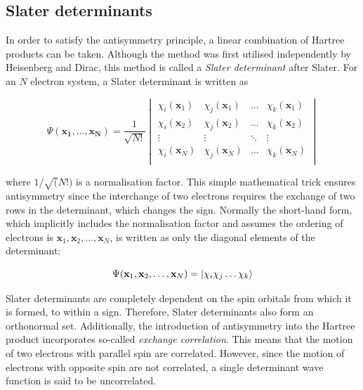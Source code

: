 \subsection{Slater determinants}

In order to satisfy the antisymmetry principle, a linear combination of Hartree products can be taken. Although the method was first utilised independently by Heisenberg\cite{Heisenberg1926} and Dirac,\cite{Dirac1926} this method is called a \emph{Slater determinant} after Slater.\cite{Slater1929} For an $N$ electron system, a Slater determinant is written as

\begin{equation}
\Psi(\mathbf{x_1},\ldots,\mathbf{x_N}) = \frac{1}{\sqrt{N!}}
\begin{vmatrix}
\chi_i(\mathbf{x}_1) & \chi_j(\mathbf{x}_1) & \dots & \chi_k(\mathbf{x}_1) \\
\chi_i(\mathbf{x}_2) & \chi_j(\mathbf{x}_2) & \dots & \chi_k(\mathbf{x}_2) \\
\vdots & \vdots & \ddots & \vdots \\
\chi_i(\mathbf{x}_N) & \chi_j(\mathbf{x}_N) & \dots & \chi_k(\mathbf{x}_N) \\
\end{vmatrix}
\end{equation}

\noindent where $1/\sqrt(N!)$ is a normalisation factor. This simple mathematical trick ensures antisymmetry since the interchange of two electrons requires the exchange of two rows in the determinant, which changes the sign. Normally the short-hand form, which implicitly includes the normalisation factor and assumes the ordering of electrons is $\mathbf{x}_1,\mathbf{x}_2,\dots,\mathbf{x}_N$, is written as only the diagonal elements of the determinant:

\begin{equation}
  \Psi(\mathbf{x}_1,\mathbf{x}_2,\dots,\mathbf{x}_N) = \ket{\chi_i\chi_j\dots\chi_k}
\end{equation}

Slater determinants are completely dependent on the spin orbitals from which it is formed, to within a sign. Therefore, Slater determinants also form an orthonormal set. Additionally, the introduction of antisymmetry into the Hartree product incorporates so-called \emph{exchange correlation}. This means that the motion of two electrons with parallel spin are correlated. However, since the motion of electrons with opposite spin are not correlated, a single determinant wave function is said to be uncorrelated.


